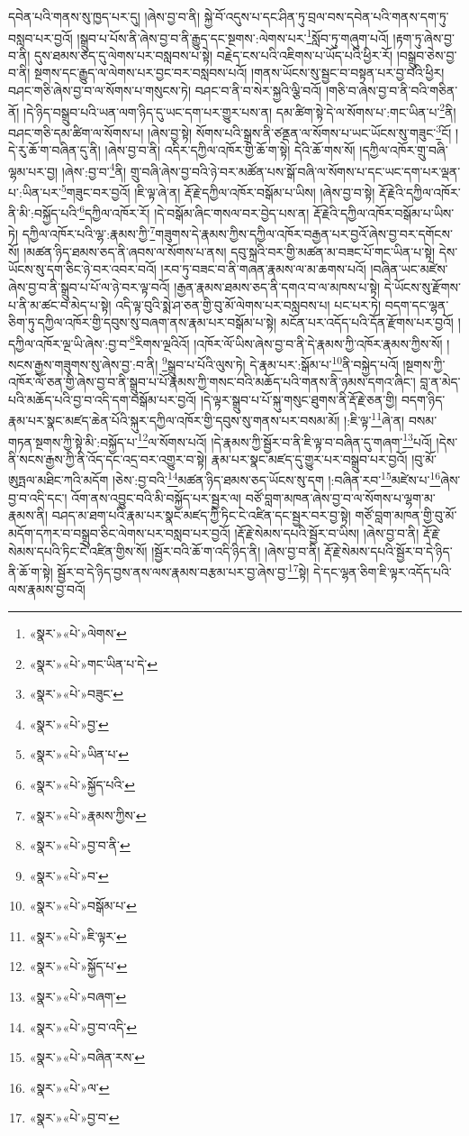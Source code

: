 དབེན་པའི་གནས་སུ་ཁྱད་པར་དུ། །ཞེས་བྱ་བ་ནི། སྐྱེ་བོ་འདུས་པ་དང་ཤིན་ཏུ་བྲལ་བས་དབེན་པའི་གནས་དག་ཏུ་བསླབ་པར་བྱའོ། །སྒྲུབ་པ་པོས་ནི་ཞེས་བྱ་བ་ནི་རྒྱུད་དང་སྔགས་:ལེགས་པར་\footnote{«སྣར་»«པེ་»ལེགས་}སློབ་ཏུ་གཞུག་པའོ། །རྟག་ཏུ་ཞེས་བྱ་བ་ནི། དུས་ཐམས་ཅད་དུ་ལེགས་པར་བསླབས་པ་སྟེ། བརྗེད་ངས་པའི་འཇིགས་པ་ཡོད་པའི་ཕྱིར་རོ། །བསྒྲུབ་ཅེས་བྱ་བ་ནི། སྔགས་དང་རྒྱུད་ལ་ལེགས་པར་བྱང་བར་བསླབས་པའོ། །གནས་ཡོངས་སུ་སྦྱང་བ་བསྟན་པར་བྱ་བའི་ཕྱིར། བཤང་གཅི་ཞེས་བྱ་བ་ལ་སོགས་པ་གསུངས་ཏེ། བཤང་བ་ནི་བ་སེར་སྐྱའི་ལྕི་བའོ། །གཅི་བ་ཞེས་བྱ་བ་ནི་བའི་གཅིན་ནོ། །དེ་ཉིད་བསྒྲུབ་པའི་ཡན་ལག་ཉིད་དུ་ཡང་དག་པར་གྱུར་པས་ན། དམ་ཚིག་སྟེ་དེ་ལ་སོགས་པ་:གང་ཡིན་པ་\footnote{«སྣར་»«པེ་»གང་ཡིན་པ་དེ་}ནི། བཤང་གཅི་དམ་ཚིག་ལ་སོགས་པ། །ཞེས་བྱ་སྟེ། སོགས་པའི་སྒྲས་ནི་ཙནྡན་ལ་སོགས་པ་ཡང་ཡོངས་སུ་གཟུང་\footnote{«སྣར་»«པེ་»བཟུང་}ངོ། །དེ་རུ་ཆོ་ག་བཞིན་དུ་ནི། །ཞེས་བྱ་བ་ནི། འདིར་དཀྱིལ་འཁོར་གྱི་ཆོ་ག་སྟེ། དེའི་ཆོ་གས་སོ། །དཀྱིལ་འཁོར་གྲུ་བཞི་ལྷམ་པར་བྱ། །ཞེས་:བྱ་བ་\footnote{«སྣར་»«པེ་»བྱ་}ནི། གྲུ་བཞི་ཞེས་བྱ་བའི་ཉེ་བར་མཚོན་པས་སྒོ་བཞི་ལ་སོགས་པ་དང་ཡང་དག་པར་ལྡན་པ་:ཡིན་པར་\footnote{«སྣར་»«པེ་»ཡིན་པ་}གཟུང་བར་བྱའོ། །ཇི་ལྟ་ཞེ་ན། རྡོ་རྗེ་དཀྱིལ་འཁོར་བསྒོམ་པ་ཡིས། །ཞེས་བྱ་བ་སྟེ། རྡོ་རྗེའི་དཀྱིལ་འཁོར་ནི་མི་:བསྐྱོད་པའི་\footnote{«སྣར་»«པེ་»སྐྱོད་པའི་}དཀྱིལ་འཁོར་རོ། །དེ་བསྒོམ་ཞིང་གསལ་བར་བྱེད་པས་ན། རྡོ་རྗེའི་དཀྱིལ་འཁོར་བསྒོམ་པ་ཡིས་ཏེ། དཀྱིལ་འཁོར་པའི་ལྷ་:རྣམས་ཀྱི་\footnote{«སྣར་»«པེ་»རྣམས་ཀྱིས་}གཟུགས་དེ་རྣམས་ཀྱིས་དཀྱིལ་འཁོར་བརྒྱན་པར་བྱའོ་ཞེས་བྱ་བར་དགོངས་སོ། །མཚན་ཉིད་ཐམས་ཅད་ནི་ཞབས་ལ་སོགས་པ་ནས། དབུ་སྐྲའི་བར་གྱི་མཚན་མ་བཟང་པོ་གང་ཡིན་པ་སྟེ། དེས་ཡོངས་སུ་དག་ཅིང་ཉེ་བར་འབར་བའོ། །རབ་ཏུ་བཟང་བ་ནི་གཞན་རྣམས་ལ་མ་ཆགས་པའོ། །བཞིན་ཡང་མཛེས་ཞེས་བྱ་བ་ནི་སྒྲུབ་པ་པོ་ལ་ཉེ་བར་ལྟ་བའོ། །རྒྱན་རྣམས་ཐམས་ཅད་ནི་དགའ་བ་ལ་མཁས་པ་སྟེ། དེ་ཡོངས་སུ་རྫོགས་པ་ནི་མ་ཚང་བ་མེད་པ་སྟེ། འདི་ལྟ་བུའི་སྨེ་ཤ་ཅན་གྱི་བུ་མོ་ལེགས་པར་བསླབས་པ། པང་པར་ཏེ། བདག་དང་ལྷན་ཅིག་ཏུ་དཀྱིལ་འཁོར་གྱི་དབུས་སུ་བཞག་ནས་རྣམ་པར་བསྒོམ་པ་སྟེ། མངོན་པར་འདོད་པའི་དོན་རྫོགས་པར་བྱའོ། །དཀྱིལ་འཁོར་ལྔ་ཡི་ཞེས་:བྱ་བ་\footnote{«སྣར་»«པེ་»བྱ་བ་ནི་}རིགས་ལྔའིའོ། །འཁོར་ལོ་ཡིས་ཞེས་བྱ་བ་ནི་དེ་རྣམས་ཀྱི་འཁོར་རྣམས་ཀྱིས་སོ། །སངས་རྒྱས་གཟུགས་སུ་ཞེས་བྱ་:བ་ནི། \footnote{«སྣར་»«པེ་»བ་}སྒྲུབ་པ་པོའི་ལུས་ཏེ། དེ་རྣམ་པར་:སྒོམ་པ་\footnote{«སྣར་»«པེ་»བསྒོམ་པ་}ནི་བསྐྱེད་པའོ། །སྔགས་ཀྱི་འཁོར་ལོ་ཅན་གྱི་ཞེས་བྱ་བ་ནི་སྒྲུབ་པ་པོ་རྣམས་ཀྱི་གསང་བའི་མཆོད་པའི་གནས་ནི་ཉམས་དགའ་ཞིང་། བླ་ན་མེད་པའི་མཆོད་པའི་བྱ་བ་འདི་དག་བསྒོམ་པར་བྱའོ། །དེ་ལྟར་སྒྲུབ་པ་པོ་སྐུ་གསུང་ཐུགས་ནི་རྡོ་རྗེ་ཅན་གྱི། བདག་ཉིད་རྣམ་པར་སྣང་མཛད་ཆེན་པོའི་སྐུར་དཀྱིལ་འཁོར་གྱི་དབུས་སུ་གནས་པར་བསམ་མོ། །:ཇི་ལྟ་\footnote{«སྣར་»«པེ་»ཇི་ལྟར་}ཞེ་ན། བསམ་གཏན་སྔགས་ཀྱི་སྟེ་མི་:བསྐྱོད་པ་\footnote{«སྣར་»«པེ་»སྐྱོད་པ་}ལ་སོགས་པའོ། །དེ་རྣམས་ཀྱི་སྦྱོར་བ་ནི་ཇི་ལྟ་བ་བཞིན་དུ་གཞག་\footnote{«སྣར་»«པེ་»བཞག་}པའོ། །དེས་ནི་སངས་རྒྱས་ཀྱི་ནི་འོད་དང་འདྲ་བར་འགྱུར་བ་སྟེ། རྣམ་པར་སྣང་མཛད་དུ་གྱུར་པར་བསྒྲུབ་པར་བྱའོ། །བུ་མོ་ཨུཏྤལ་མཐིང་ཀའི་མདོག །ཅེས་:བྱ་བའི་\footnote{«སྣར་»«པེ་»བྱ་བ་འདི་}མཚན་ཉིད་ཐམས་ཅད་ཡོངས་སུ་དག །:བཞིན་རབ་\footnote{«སྣར་»«པེ་»བཞིན་རས་}མཛེས་པ་\footnote{«སྣར་»«པེ་»ལ་}ཞེས་བྱ་བ་འདི་དང་། འོག་ནས་འབྱུང་བའི་མི་བསྐྱོད་པར་སྦྱར་ལ། བཙོ་བླག་མཁན་ཞེས་བྱ་བ་ལ་སོགས་པ་ལྷག་མ་རྣམས་ནི། བཤད་མ་ཐག་པའི་རྣམ་པར་སྣང་མཛད་ཀྱི་ཏིང་ངེ་འཛིན་དང་སྦྱར་བར་བྱ་སྟེ། གཙོ་བླག་མཁན་གྱི་བུ་མོ་མདོག་དཀར་བ་བསྒྲུབ་ཅིང་ལེགས་པར་བསླབ་པར་བྱའོ། །རྡོ་རྗེ་སེམས་དཔའི་སྦྱོར་བ་ཡིས། །ཞེས་བྱ་བ་ནི། རྡོ་རྗེ་སེམས་དཔའི་ཏིང་ངེ་འཛིན་གྱིས་སོ། །སྦྱོར་བའི་ཆོ་ག་འདི་ཉིད་ནི། །ཞེས་བྱ་བ་ནི། རྡོ་རྗེ་སེམས་དཔའི་སྦྱོར་བ་དེ་ཉིད་ནི་ཆོ་ག་སྟེ། སྦྱོར་བ་དེ་ཉིད་བྱས་ནས་ལས་རྣམས་བརྩམ་པར་བྱ་ཞེས་བྱ་\footnote{«སྣར་»«པེ་»བྱ་བ་}སྟེ། དེ་དང་ལྷན་ཅིག་ཇི་ལྟར་འདོད་པའི་ལས་རྣམས་བྱ་བའོ། 